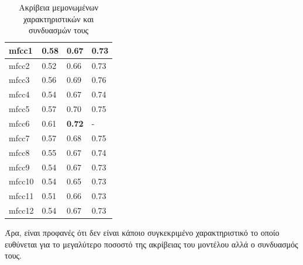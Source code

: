 \begin{table}[H]
\begin{tabular}{|l|l|l|l|}
mfcc1                   & 0.58                        & 0.67                       & 0.73                       \\\hline
mfcc2                   & 0.52                        & 0.66                       & 0.73                       \\\hline
mfcc3                   & 0.56                        & 0.69                       & 0.76                       \\\hline
mfcc4                   & 0.54                        & 0.67                       & 0.74                       \\\hline
mfcc5                   & 0.57                        & 0.70                       & 0.75                       \\\hline
mfcc6                   & 0.61                        & \textbf{0.72}              & -                          \\\hline
mfcc7                   & 0.57                        & 0.68                       & 0.75                       \\\hline
mfcc8                   & 0.55                        & 0.67                       & 0.74                       \\\hline
mfcc9                   & 0.54                        & 0.67                       & 0.73                       \\\hline
mfcc10                  & 0.54                        & 0.65                       & 0.73                       \\\hline
mfcc11                  & 0.51                        & 0.66                       & 0.73                       \\\hline
mfcc12                  & 0.54                        & 0.67                       & 0.73                       \\\hline
\end{tabular}
\caption{Ακρίβεια μεμονωμένων χαρακτηριστικών και συνδυασμών τους}
\end{table}
Άρα, είναι προφανές ότι δεν είναι κάποιο συγκεκριμένο χαρακτηριστικό το οποίο ευθύνεται για το μεγαλύτερο ποσοστό της ακρίβειας του μοντέλου αλλά ο συνδυασμός τους.










